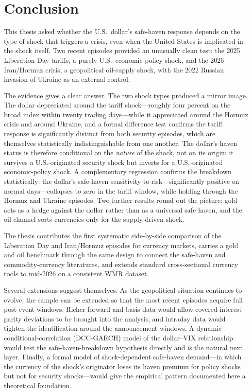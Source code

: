 
\chapter{Conclusion}
\label{ch:conclusion}

This thesis asked whether the U.S.\ dollar's safe-haven response depends on the type of
shock that triggers a crisis, even when the United States is implicated in the shock itself.
Two recent episodes provided an unusually clean test: the 2025 Liberation Day tariffs, a
purely U.S.\ economic-policy shock, and the 2026 Iran/Hormuz crisis, a geopolitical
oil-supply shock, with the 2022 Russian invasion of Ukraine as an external control.

The evidence gives a clear answer. The two shock types produced a mirror image. The dollar
depreciated around the tariff shock---roughly four percent on the broad index within twenty
trading days---while it appreciated around the Hormuz crisis and around Ukraine, and a formal
difference test confirms the tariff response is significantly distinct from both security
episodes, which are themselves statistically indistinguishable from one another. The dollar's
haven status is therefore conditional on the \emph{nature} of the shock, not on its origin:
it survives a U.S.-originated security shock but inverts for a U.S.-originated economic-policy
shock. A complementary regression confirms the breakdown statistically: the dollar's
safe-haven sensitivity to risk---significantly positive on normal days---collapses to zero in
the tariff window, while holding through the Hormuz and Ukraine episodes. Two further results
round out the picture:
gold acts as a hedge against the dollar rather than as a universal safe haven, and the oil
channel sorts currencies only for the supply-driven shock.

The thesis contributes the first systematic side-by-side comparison of the Liberation Day and
Iran/Hormuz episodes for currency markets, carries a gold and oil benchmark through the same
design to connect the safe-haven and commodity-currency literatures, and extends standard
cross-sectional currency tools to mid-2026 on a consistent WMR dataset.

Several extensions suggest themselves. As the geopolitical situation continues to evolve, the
sample can be extended so that the most recent episodes acquire full post-event windows.
Richer forward and basis data would allow covered-interest-parity deviations to be brought
into the analysis, and intraday data would tighten the identification around the announcement
windows. A dynamic conditional-correlation (DCC-GARCH) model of the dollar--VIX relationship
would test the safe-haven-breakdown hypothesis directly and is the natural next layer.
Finally, a formal model of shock-dependent safe-haven demand---in which the currency of the
shock's originator loses its haven premium for policy shocks but not for security
shocks---would give the empirical pattern documented here a theoretical foundation.
